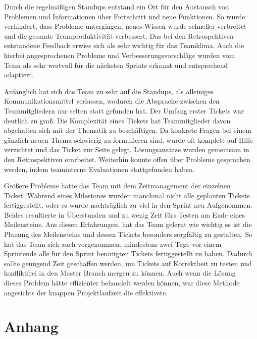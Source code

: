 \documentclass[10pt, a4paper]{article}
\begin{document}
\begin{onehalfspace}
Durch die regelmäßigen Standups entstand ein Ort für den Austausch von Problemen und Informationen über Fortschritt und neue Funktionen.
So wurde verhindert, dass Probleme untergingen, neues Wissen wurde schneller verbreitet und die gesamte Teamproduktivität verbessert.
Das bei den Retrospektiven entstandene Feedback erwies sich als sehr wichtig für das Teamklima.
Auch die hierbei angesprochenen Probleme und Verbesserungsvorschläge wurden vom Team als sehr wertvoll für die nächsten Sprints erkannt und entsprechend adaptiert.

Anfänglich hat sich das Team zu sehr auf die Standups, als alleiniges Kommunikationsmittel verlassen, wodurch die Absprache zwischen den Teammitgliedern nur selten statt gefunden hat.
Der Umfang erster Tickets war deutlich zu groß.
Die Komplexität eines Tickets hat Teammitglieder davon abgehalten sich mit der Thematik zu beschäftigen.
Da konkrete Fragen bei einem gänzlich neuen Thema schwierig zu formulieren sind, wurde oft komplett auf Hilfe verzichtet und das Ticket zur Seite gelegt.
Lösungsansätze wurden gemeinsam in den Retrospektiven erarbeitet.
Weiterhin konnte offen über Probleme gesprochen werden, indem teaminterne Evaluationen stattgefunden haben.

Größere Probleme hatte das Team mit dem Zeitmanagement der einzelnen Ticket.
Während eines Milestones wurden manchmal nicht alle geplanten Tickets fertiggestellt, oder es wurde nachträglich zu viel in den Sprint neu Aufgenommen.
Beides resultierte in Überstunden und zu wenig Zeit fürs Testen am Ende eines Meilensteins.
Aus diesen Erfahrungen, hat das Team gelernt wie wichtig es ist die Planung des Meilensteins und dessen Tickets besonders sorgfältig zu gestalten.
So hat das Team sich auch vorgenommen, mindestens zwei Tage vor einem Sprintende alle für den Sprint benötigten Tickets fertiggestellt zu haben.
Dadurch sollte genügend Zeit geschaffen werden, um Tickets auf Korrektheit zu testen und konfliktfrei in den Master Branch mergen zu können.
Auch wenn die Lösung dieses Problem hätte effizienter behandelt werden können, war diese Methode angesichts der knappen Projektlaufzeit die effektivste.


\end{onehalfspace}

\newpage
\section{Anhang}
\label{pdf:macioprojektskizze}
\label{FigmaDesigns}
\label{FlowCharts}
\label{anhang:lucidchart}
\printbibliography
\end{document}
